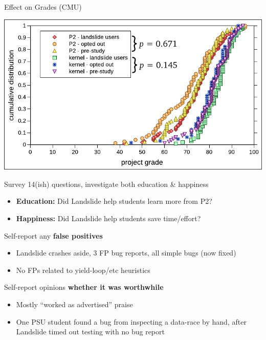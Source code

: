 \documentclass[xcolor=dvipsnames]{beamer}
\begin{document}
\begin{frame}{Effect on Grades (CMU)} %
	\begin{center}
		\includegraphics[width=\textwidth]{photo-of-ze-studence-cdf.pdf}
	\end{center}
\end{frame}

\begin{frame}{Survey}
	14(ish) questions, investigate both education \& happiness
	\begin{itemize}
		\item {\bf Education:} Did Landslide help students learn more from P2?
		\item {\bf Happiness:} Did Landslide help students save time/effort?
	\end{itemize}
	\pause
	\linegap

	Self-report any {\bf false positives}
	\begin{itemize}
		\item Landslide crashes aside, 3 FP bug reports, all simple bugs (now fixed)
		\item No FPs related to yield-loop/etc heuristics
	\end{itemize}
	\linegap

	Self-report opinions {\bf whether it was worthwhile}
	\begin{itemize}
		\item Mostly ``worked as advertised'' praise
		\item One PSU student found a bug from inspecting a data-race by hand,
			after Landslide timed out testing with no bug report
	\end{itemize}
\end{frame}
\end{document}
